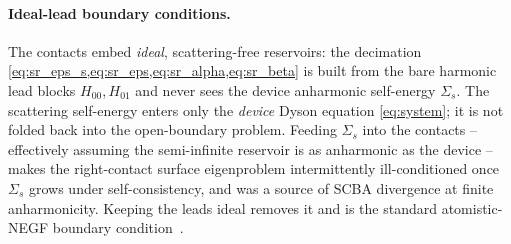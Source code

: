 \paragraph{Ideal-lead boundary conditions.}
The contacts embed \emph{ideal}, scattering-free reservoirs: the decimation
\cref{eq:sr_eps_s,eq:sr_eps,eq:sr_alpha,eq:sr_beta} is built from the bare
harmonic lead blocks $H_{00},H_{01}$ and never sees the device anharmonic
self-energy $\Sigma_s$. The scattering self-energy enters only the
\emph{device} Dyson equation \cref{eq:system}; it is not folded back into the
open-boundary problem. Feeding $\Sigma_s$ into the contacts -- effectively
assuming the semi-infinite reservoir is as anharmonic as the device -- makes
the right-contact surface eigenproblem intermittently ill-conditioned once
$\Sigma_s$ grows under self-consistency, and was a source of SCBA divergence at
finite anharmonicity. Keeping the leads ideal removes it and is the standard
atomistic-NEGF boundary condition~\cite{luisier_atomistic_2012,sadasivam_atomistic_2014}.

